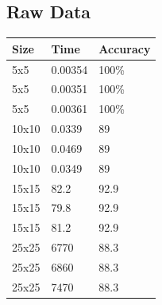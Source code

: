 \documentclass[12pt, letterpaper]
{article}
\begin{document}
\subsection{Raw Data}
\begin{table}[!ht]
    \centering
    \begin{tabular}{lll}
    \hline
        \textbf{Size} & \textbf{Time} & \textbf{Accuracy} \\ \hline
        5x5 & 0.00354 & 100\% \\ 
        5x5 & 0.00351 & 100\% \\ 
        5x5 & 0.00361 & 100\% \\ 
        10x10 & 0.0339 & 89 \\ 
        10x10 & 0.0469 & 89 \\ 
        10x10 & 0.0349 & 89 \\ 
        15x15 & 82.2 & 92.9 \\ 
        15x15 & 79.8 & 92.9 \\ 
        15x15 & 81.2 & 92.9 \\ 
        25x25 & 6770 & 88.3 \\ 
        25x25 & 6860 & 88.3 \\ 
        25x25 & 7470 & 88.3 \\ \hline
    \end{tabular}
\end{table}

% 

% 




\end{document}
